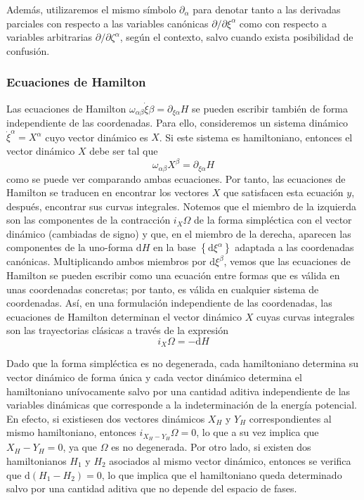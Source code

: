 Además, utilizaremos el mismo símbolo $\partial_{\alpha}$ para denotar tanto a las derivadas parciales con respecto a las variables canónicas $\partial / \partial \xi^{\alpha}$ como con respecto a variables arbitrarias $\partial / \partial \zeta^{\alpha}$, según el contexto, salvo cuando exista posibilidad de confusión.

\subsubsection{Ecuaciones de Hamilton}

Las ecuaciones de Hamilton $\omega_{\alpha \beta} \dot{\xi} \beta=\partial_{\xi \alpha} H$ se pueden escribir también de forma independiente de las coordenadas. Para ello, consideremos un sistema dinámico $\dot{\xi}^{\alpha}=X^{\alpha}$ cuyo vector dinámico es $X$. Si este sistema es hamiltoniano, entonces el vector dinámico $X$ debe ser tal que
$$
\omega_{\alpha \beta} X^{\beta}=\partial_{\xi \alpha} H
$$
como se puede ver comparando ambas ecuaciones. Por tanto, las ecuaciones de Hamilton se traducen en encontrar los vectores $X$ que satisfacen esta ecuación $y$, después, encontrar sus curvas integrales. Notemos que el miembro de la izquierda son las componentes de la contracción $i_{X} \Omega$ de la forma simpléctica con el vector dinámico (cambiadas de signo) y que, en el miembro de la derecha, aparecen las componentes de la uno-forma $\mathrm{d} H$ en la base $\left\{\mathrm{d} \xi^{\alpha}\right\}$ adaptada a las coordenadas canónicas. Multiplicando ambos miembros por $\mathrm{d} \xi^{\beta}$, vemos que las ecuaciones de Hamilton se pueden escribir como una ecuación entre formas que es válida en unas coordenadas concretas; por tanto, es válida en cualquier sistema de coordenadas. Así, en una formulación independiente de las coordenadas, las ecuaciones de Hamilton determinan el vector dinámico $X$ cuyas curvas integrales son las trayectorias clásicas a través de la expresión
$$
i_{X} \Omega=-\mathrm{d} H
$$

Dado que la forma simpléctica es no degenerada, cada hamiltoniano determina su vector dinámico de forma única y cada vector dinámico determina el hamiltoniano unívocamente salvo por una cantidad aditiva independiente de las variables dinámicas que corresponde a la indeterminación de la energía potencial. En efecto, si existiesen dos vectores dinámicos $X_{H}$ y $Y_{H}$ correspondientes al mismo hamiltoniano, entonces $i_{X_{H}-Y_{H}} \Omega=0$, lo que a su vez implica que $X_{H}-Y_{H}=0$, ya que $\Omega$ es no degenerada. Por otro lado, si existen dos hamiltonianos $H_{1}$ y $H_{2}$ asociados al mismo vector dinámico, entonces se verifica que $\mathrm{d}\left(H_{1}-H_{2}\right)=0$, lo que implica que el hamiltoniano queda determinado salvo por una cantidad aditiva que no depende del espacio de fases.

